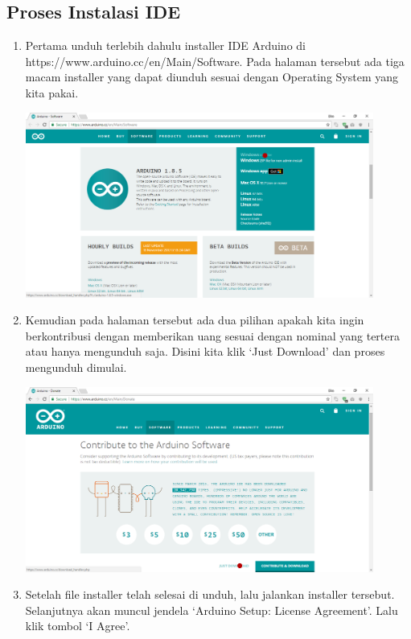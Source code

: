 \subsection{Proses Instalasi IDE}

\begin{enumerate}
\item Pertama unduh terlebih dahulu installer IDE Arduino di https://www.arduino.cc/en/Main/Software. Pada halaman tersebut ada tiga macam installer yang dapat diunduh sesuai dengan Operating System yang kita pakai.
\break\\
\centerline{\includegraphics[width=0.9\textwidth]{figures/aride8.png}}
\item Kemudian pada halaman tersebut ada dua pilihan apakah kita ingin berkontribusi dengan memberikan uang sesuai dengan nominal yang tertera atau hanya mengunduh saja. Disini kita klik `Just Download' dan proses mengunduh dimulai.
\break\\
\centerline{\includegraphics[width=0.9\textwidth]{figures/aride9.png}}
\item Setelah file installer telah selesai di unduh, lalu jalankan installer tersebut. Selanjutnya akan muncul jendela `Arduino Setup: License Agreement'. Lalu klik tombol `I Agree'.
\break\\

\end{enumerate}
